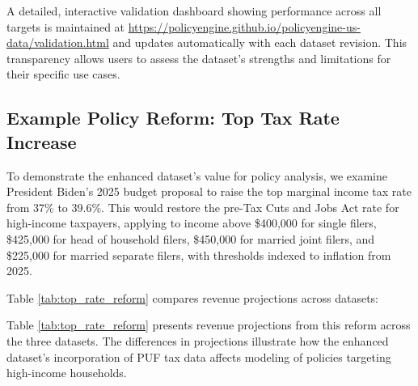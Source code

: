 A detailed, interactive validation dashboard showing performance across all targets is maintained at \url{https://policyengine.github.io/policyengine-us-data/validation.html} and updates automatically with each dataset revision. This transparency allows users to assess the dataset's strengths and limitations for their specific use cases.

\subsection{Example Policy Reform: Top Tax Rate Increase}

To demonstrate the enhanced dataset's value for policy analysis, we examine President Biden's 2025 budget proposal to raise the top marginal income tax rate from 37\% to 39.6\%. This would restore the pre-Tax Cuts and Jobs Act rate for high-income taxpayers, applying to income above \$400,000 for single filers, \$425,000 for head of household filers, \$450,000 for married joint filers, and \$225,000 for married separate filers, with thresholds indexed to inflation from 2025.

Table \ref{tab:top_rate_reform} compares revenue projections across datasets:



Table \ref{tab:top_rate_reform} presents revenue projections from this reform across the three datasets. The differences in projections illustrate how the enhanced dataset's incorporation of PUF tax data affects modeling of policies targeting high-income households.